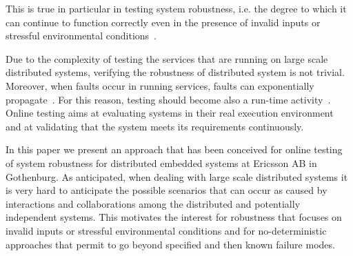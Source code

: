 This is true in particular in testing system robustness, i.e. the degree to which it can continue to function correctly even in the presence of invalid inputs or stressful environmental conditions~\cite{STANDARD}.

Due to the complexity of testing the services that are running on large scale distributed systems, verifying the robustness of distributed system is not trivial. %
Moreover, when faults occur in running services, faults can exponentially propagate~\cite{verification_testing}. 
For this reason, testing should become %
also a run-time activity~\cite{towards}. Online testing aims at evaluating systems in their real execution environment~\cite{Bertolino2012} and at validating %
that the system meets its requirements continuously. 


In this paper we present an approach that has been conceived for online testing of system robustness for distributed embedded systems at Ericsson AB in Gothenburg. 
As anticipated, when dealing with large scale distributed systems it is 
very hard to anticipate the possible scenarios that can occur as caused by interactions and collaborations among the distributed and potentially independent systems. This motivates the interest for robustness that focuses on invalid inputs or stressful environmental conditions and for no-deterministic approaches that permit to go beyond specified and then known failure modes.

